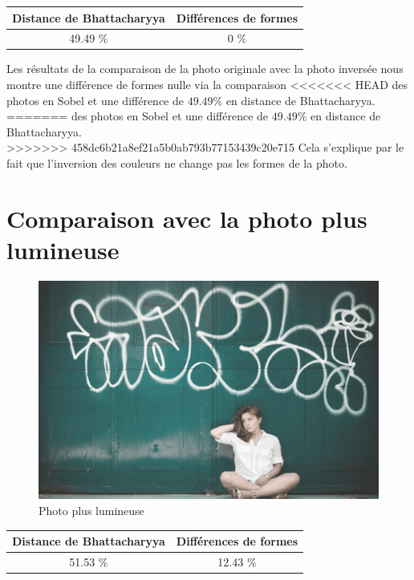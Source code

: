 \documentclass[]{article}
\begin{document}
\begin{description}
\begin{center}
\begin{tabular}{|c|c|}
  \hline
  Distance de Bhattacharyya & Différences de formes \\
  \hline
  49.49 \% & 0 \% \\
  \hline
\end{tabular}
\end{center}


Les résultats de la comparaison de la photo originale avec la photo
inversée nous montre une différence de formes nulle via la comparaison
<<<<<<< HEAD
des photos en Sobel et une différence de $49.49\%$ en distance de
Bhattacharyya. \\ 
=======
des photos en Sobel et une différence de $49.49 \%$ en distance de
Bhattacharyya. \\
>>>>>>> 458dc6b21a8ef21a5b0ab793b77153439c20e715
Cela s'explique par le fait que l'inversion des couleurs ne change pas les
formes de la photo.

\newpage

\section{Comparaison avec la photo plus
lumineuse}\label{comparaison-avec-la-photo-plus-lumineuse}

\begin{figure}[htbp]
\centering
\includegraphics{photos/lumineux.jpg}
\caption{Photo plus lumineuse}
\end{figure}

\begin{center}
\begin{tabular}{|c|c|}
  \hline
  Distance de Bhattacharyya & Différences de formes \\
  \hline
  51.53 \% & 12.43 \% \\
  \hline
\end{tabular}
\end{center}



\end{description}
\end{document}
